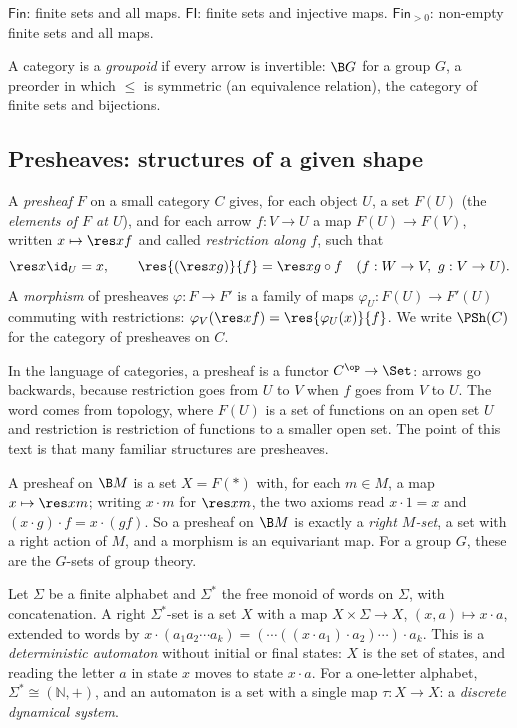 \begin{example}\label{ex:finsets}
$\mathsf{Fin}$: finite sets and all maps. $\mathsf{FI}$: finite sets and injective maps. $\mathsf{Fin}_{>0}$: non-empty finite sets and all maps.
\end{example}

A category is a \emph{groupoid} if every arrow is invertible: $\B G$ for a group $G$, a preorder in which $\le$ is symmetric (an equivalence relation), the category of finite sets and bijections.

\subsection{Presheaves: structures of a given shape}

\begin{definition}[Presheaf]
A \emph{presheaf} $F$ on a small category $C$ gives, for each object $U$, a set $F(U)$ (the \emph{elements of $F$ at $U$}), and for each arrow $f : V\to U$ a map $F(U)\to F(V)$, written $x\mapsto\res xf$ and called \emph{restriction along $f$}, such that
\[
\res x{\id_U} = x,\qquad \res{(\res xg)}{f} = \res x{g\circ f}\quad(f : W\to V,\ g : V\to U).
\]
A \emph{morphism} of presheaves $\varphi : F\to F'$ is a family of maps $\varphi_U : F(U)\to F'(U)$ commuting with restrictions: $\varphi_V(\res xf) = \res{\varphi_U(x)}{f}$. We write $\PSh(C)$ for the category of presheaves on $C$.
\end{definition}

In the language of categories, a presheaf is a functor $C^{\op}\to\Set$: arrows go backwards, because restriction goes from $U$ to $V$ when $f$ goes from $V$ to $U$. The word comes from topology, where $F(U)$ is a set of functions on an open set $U$ and restriction is restriction of functions to a smaller open set. The point of this text is that many familiar structures are presheaves.

\begin{example}\label{ex:Msets}
A presheaf on $\B M$ is a set $X = F(\ast)$ with, for each $m\in M$, a map $x\mapsto\res xm$; writing $x\cdot m$ for $\res xm$, the two axioms read $x\cdot 1 = x$ and $(x\cdot g)\cdot f = x\cdot(gf)$. So a presheaf on $\B M$ is exactly a \emph{right $M$-set}, a set with a right action of $M$, and a morphism is an equivariant map. For a group $G$, these are the $G$-sets of group theory.
\end{example}

\begin{example}[Automata]\label{ex:automata}
Let $\Sigma$ be a finite alphabet and $\Sigma^*$ the free monoid of words on $\Sigma$, with concatenation. A right $\Sigma^*$-set is a set $X$ with a map $X\times\Sigma\to X$, $(x,a)\mapsto x\cdot a$, extended to words by $x\cdot(a_1a_2\cdots a_k) = (\cdots((x\cdot a_1)\cdot a_2)\cdots)\cdot a_k$. This is a \emph{deterministic automaton} without initial or final states: $X$ is the set of states, and reading the letter $a$ in state $x$ moves to state $x\cdot a$. For a one-letter alphabet, $\Sigma^*\cong(\mathbb N,+)$, and an automaton is a set with a single map $\tau : X\to X$: a \emph{discrete dynamical system}.
\end{example}

